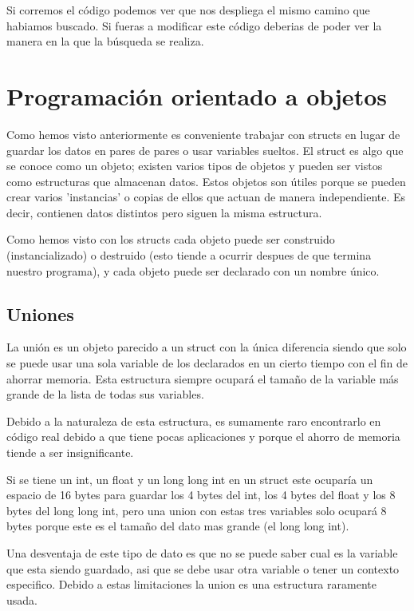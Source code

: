 \documentclass{article}
\begin{document}
Si corremos el código podemos ver que nos despliega el mismo camino que habiamos buscado. Si fueras a modificar este código deberias de poder ver la manera en la que la búsqueda se realiza.

\section{Programación orientado a objetos}

Como hemos visto anteriormente es conveniente trabajar con structs en lugar de guardar los datos en pares de pares o usar variables sueltos. El struct es algo que se conoce como un objeto; existen varios tipos de objetos y pueden ser vistos como estructuras que almacenan datos. Estos objetos son útiles porque se pueden crear varios 'instancias' o copias de ellos que actuan de manera independiente. Es decir, contienen datos distintos pero siguen la misma estructura.

Como hemos visto con los structs cada objeto puede ser construido (instancializado) o destruido (esto tiende a ocurrir despues de que termina nuestro programa), y cada objeto puede ser declarado con un nombre único.

\subsection{Uniones}

La unión es un objeto parecido a un struct con la única diferencia siendo que solo se puede usar una sola variable de los declarados en un cierto tiempo con el fin de ahorrar memoria. Esta estructura siempre ocupará el tamaño de la variable más grande de la lista de todas sus variables.

Debido a la naturaleza de esta estructura, es sumamente raro encontrarlo en código real debido a que tiene pocas aplicaciones y porque el ahorro de memoria tiende a ser insignificante.

Si se tiene un int, un float y un long long int en un struct este ocuparía un espacio de 16 bytes para guardar los 4 bytes del int, los 4 bytes del float y los 8 bytes del long long int, pero una union con estas tres variables solo ocupará 8 bytes porque este es el tamaño del dato mas grande (el long long int).

Una desventaja de este tipo de dato es que no se puede saber cual es la variable que esta siendo guardado, asi que se debe usar otra variable o tener un contexto especifico. Debido a estas limitaciones la union es una estructura raramente usada.
\end{document}
